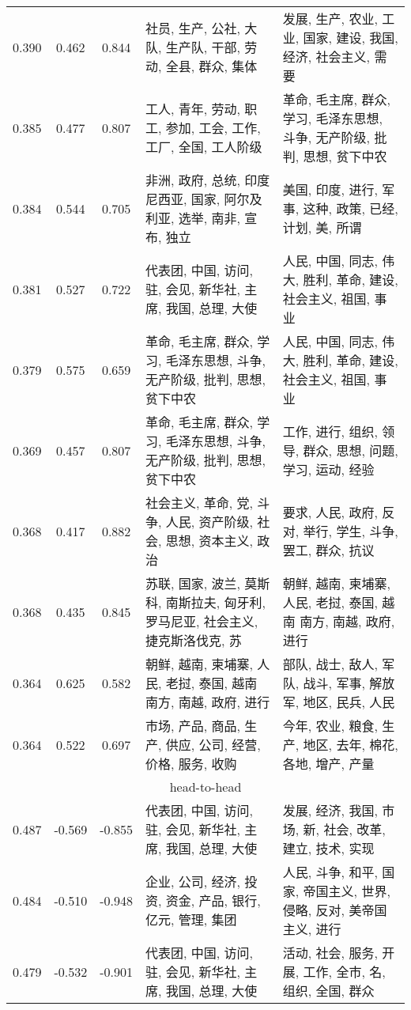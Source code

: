 \begin{tabular}{cccp{5cm}p{5cm}}
0.390 & 0.462 & 0.844 & 社员, 生产, 公社, 大队, 生产队, 干部, 劳动, 全县, 群众, 集体 & 发展, 生产, 农业, 工业, 国家, 建设, 我国, 经济, 社会主义, 需要 \\
0.385 & 0.477 & 0.807 & 工人, 青年, 劳动, 职工, 参加, 工会, 工作, 工厂, 全国, 工人阶级 & 革命, 毛主席, 群众, 学习, 毛泽东思想, 斗争, 无产阶级, 批判, 思想, 贫下中农 \\
0.384 & 0.544 & 0.705 & 非洲, 政府, 总统, 印度尼西亚, 国家, 阿尔及利亚, 选举, 南非, 宣布, 独立 & 美国, 印度, 进行, 军事, 这种, 政策, 已经, 计划, 美, 所谓 \\
0.381 & 0.527 & 0.722 & 代表团, 中国, 访问, 驻, 会见, 新华社, 主席, 我国, 总理, 大使 & 人民, 中国, 同志, 伟大, 胜利, 革命, 建设, 社会主义, 祖国, 事业 \\
0.379 & 0.575 & 0.659 & 革命, 毛主席, 群众, 学习, 毛泽东思想, 斗争, 无产阶级, 批判, 思想, 贫下中农 & 人民, 中国, 同志, 伟大, 胜利, 革命, 建设, 社会主义, 祖国, 事业 \\
0.369 & 0.457 & 0.807 & 革命, 毛主席, 群众, 学习, 毛泽东思想, 斗争, 无产阶级, 批判, 思想, 贫下中农 & 工作, 进行, 组织, 领导, 群众, 思想, 问题, 学习, 运动, 经验 \\
0.368 & 0.417 & 0.882 & 社会主义, 革命, 党, 斗争, 人民, 资产阶级, 社会, 思想, 资本主义, 政治 & 要求, 人民, 政府, 反对, 举行, 学生, 斗争, 罢工, 群众, 抗议 \\
0.368 & 0.435 & 0.845 & 苏联, 国家, 波兰, 莫斯科, 南斯拉夫, 匈牙利, 罗马尼亚, 社会主义, 捷克斯洛伐克, 苏 & 朝鲜, 越南, 柬埔寨, 人民, 老挝, 泰国, 越南 南方, 南越, 政府, 进行 \\
0.364 & 0.625 & 0.582 & 朝鲜, 越南, 柬埔寨, 人民, 老挝, 泰国, 越南 南方, 南越, 政府, 进行 & 部队, 战士, 敌人, 军队, 战斗, 军事, 解放军, 地区, 民兵, 人民 \\
0.364 & 0.522 & 0.697 & 市场, 产品, 商品, 生产, 供应, 公司, 经营, 价格, 服务, 收购 & 今年, 农业, 粮食, 生产, 地区, 去年, 棉花, 各地, 增产, 产量 \\
\midrule
\multicolumn{5}{c}{head-to-head}\\
0.487 & -0.569 & -0.855 & 代表团, 中国, 访问, 驻, 会见, 新华社, 主席, 我国, 总理, 大使 & 发展, 经济, 我国, 市场, 新, 社会, 改革, 建立, 技术, 实现 \\
0.484 & -0.510 & -0.948 & 企业, 公司, 经济, 投资, 资金, 产品, 银行, 亿元, 管理, 集团 & 人民, 斗争, 和平, 国家, 帝国主义, 世界, 侵略, 反对, 美帝国主义, 进行 \\
0.479 & -0.532 & -0.901 & 代表团, 中国, 访问, 驻, 会见, 新华社, 主席, 我国, 总理, 大使 & 活动, 社会, 服务, 开展, 工作, 全市, 名, 组织, 全国, 群众 \\

\end{tabular}
